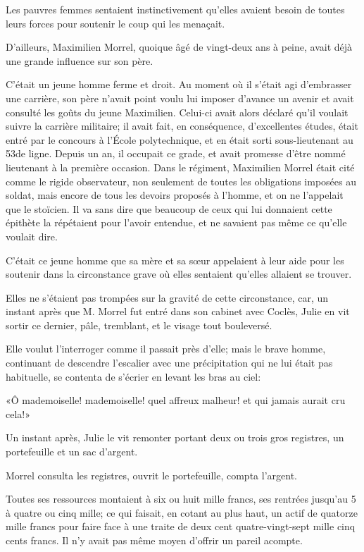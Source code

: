 Les pauvres femmes sentaient instinctivement qu'elles avaient besoin de toutes leurs forces pour soutenir le coup qui les menaçait.

D'ailleurs, Maximilien Morrel, quoique âgé de vingt-deux ans à peine, avait déjà une grande influence sur son père.

C'était un jeune homme ferme et droit. Au moment où il s'était agi d'embrasser une carrière, son père n'avait point voulu lui imposer d'avance un avenir et avait consulté les goûts du jeune Maximilien. Celui-ci avait alors déclaré qu'il voulait suivre la carrière militaire; il avait fait, en conséquence, d'excellentes études, était entré par le concours à l'École polytechnique, et en était sorti sous-lieutenant au 53\ieme de ligne. Depuis un an, il occupait ce grade, et avait promesse d'être nommé lieutenant à la première occasion. Dans le régiment, Maximilien Morrel était cité comme le rigide observateur, non seulement de toutes les obligations imposées au soldat, mais encore de tous les devoirs proposés à l'homme, et on ne l'appelait que le stoïcien. Il va sans dire que beaucoup de ceux qui lui donnaient cette épithète la répétaient pour l'avoir entendue, et ne savaient pas même ce qu'elle voulait dire.

C'était ce jeune homme que sa mère et sa sœur appelaient à leur aide pour les soutenir dans la circonstance grave où elles sentaient qu'elles allaient se trouver.

Elles ne s'étaient pas trompées sur la gravité de cette circonstance, car, un instant après que M. Morrel fut entré dans son cabinet avec Coclès, Julie en vit sortir ce dernier, pâle, tremblant, et le visage tout bouleversé.

Elle voulut l'interroger comme il passait près d'elle; mais le brave homme, continuant de descendre l'escalier avec une précipitation qui ne lui était pas habituelle, se contenta de s'écrier en levant les bras au ciel:

«Ô mademoiselle! mademoiselle! quel affreux malheur! et qui jamais aurait cru cela!»

Un instant après, Julie le vit remonter portant deux ou trois gros registres, un portefeuille et un sac d'argent.

Morrel consulta les registres, ouvrit le portefeuille, compta l'argent.

Toutes ses ressources montaient à six ou huit mille francs, ses rentrées jusqu'au 5 à quatre ou cinq mille; ce qui faisait, en cotant au plus haut, un actif de quatorze mille francs pour faire face à une traite de deux cent quatre-vingt-sept mille cinq cents francs. Il n'y avait pas même moyen d'offrir un pareil acompte.

